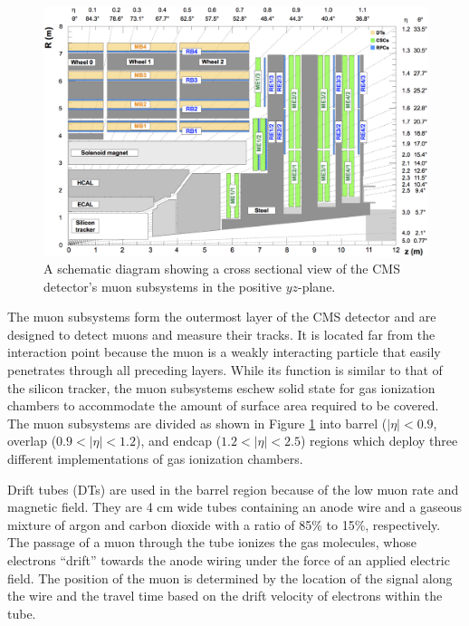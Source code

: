 \begin{figure}[htbp]
  \centering
    \includegraphics[width=5.5in]{images/muon_diagram}
    \caption[Schematic for the CMS Muon Subsystems]{A schematic diagram showing a cross sectional view of the CMS detector's muon subsystems in the positive $yz$-plane.\cite{MUONDIAGRAM}}
    \label{fig:CMSmuondiag}
\end{figure}

The muon subsystems form the outermost layer of the CMS detector and are designed to detect muons and measure their tracks. It is located far from the interaction point because the muon is a weakly interacting particle that easily penetrates through all preceding layers. While its function is similar to that of the silicon tracker, the muon subsystems eschew solid state for gas ionization chambers to accommodate the amount of surface area required to be covered. The muon subsystems are divided as shown in Figure \ref{fig:CMSmuondiag} into barrel ($\left| \eta \right| < 0.9$, overlap ($0.9 < \left| \eta \right| < 1.2$), and endcap ($1.2 < \left| \eta \right| < 2.5$) regions which deploy three different implementations of gas ionization chambers.

Drift tubes (DTs) are used in the barrel region because of the low muon rate and magnetic field. They are 4 cm wide tubes containing an anode wire and a gaseous mixture of argon and carbon dioxide with a ratio of 85\% to 15\%, respectively. The passage of a muon through the tube ionizes the gas molecules, whose electrons ``drift'' towards the anode wiring under the force of an applied electric field. The position of the muon is determined by the location of the signal along the wire and the travel time based on the drift velocity of electrons within the tube.

